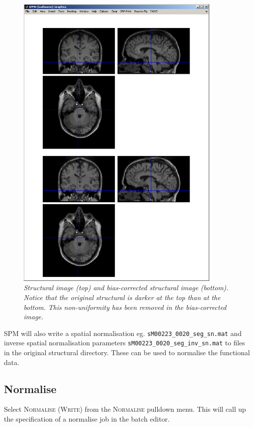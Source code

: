 \begin{figure}
\begin{center}
\includegraphics[width=100mm]{auditory/bias}
\caption{\em Structural image (top) and bias-corrected structural image (bottom). Notice that the original structural is darker at the top than at the bottom. This non-uniformity has been removed in the bias-corrected image.\label{aud_bias}}
\end{center}
\end{figure}

SPM will also write a spatial normalisation eg. \texttt{sM00223\_0020\_seg\_sn.mat} and inverse spatial normalisation parameters \texttt{sM00223\_0020\_seg\_inv\_sn.mat} to files in the original structural directory. These can be used to normalise the functional data. 

\subsection{Normalise}

Select \textsc{Normalise (Write)} from the \textsc{Normalise} pulldown menu. This will call up the specification of a normalise job in the batch editor. 

